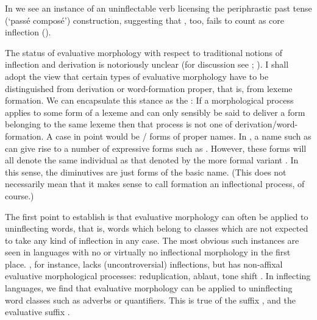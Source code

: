 \documentclass[output=paper,colorlinks,citecolor=brown]{langscibook}
\begin{document}
In  we see an instance of an uninflectable  verb licensing the periphrastic past tense (`passé composé') construction, suggesting that , too, fails to count as core inflection (\citealp[208]{spencerpopova2015}).

The status of evaluative morphology with respect to traditional notions of inflection and derivation is notoriously unclear (for discussion see \citealp[113]{spencer2013}; \citealp{grandi2015}). I shall adopt the view that certain types of evaluative morphology have to be distinguished from derivation or word-formation proper, that is, from lexeme formation. We can encapsulate this stance as the  \emph{}: If a morphological process applies to some form of a lexeme and can only sensibly be said to deliver a form belonging to the same lexeme then that process is not one of derivation/word-formation. A case in point would be / forms of proper names. In , a name such as  can give rise to a number of expressive  forms such as . However, these  forms will all denote the same individual as that denoted by the more formal variant .   In this sense, the diminutives are just forms of the basic name. (This does not necessarily mean that it makes sense to call  formation an inflectional process, of course.) 

The first point to establish is that evaluative morphology can often be applied to uninflecting words, that is, words which belong to classes which are not expected to take any kind of inflection in any case. The most obvious such instances are seen in languages with no or virtually no inflectional morphology in the first place.  , for instance, lacks (uncontroversial) inflections, but has non-affixal evaluative morphological processes: reduplication, ablaut, tone shift \citep{arcodia2015}. In  inflecting languages, we find that evaluative morphology can be applied to uninflecting word classes such as adverbs or quantifiers. This is true of the   suffix  \citep[197]{artiagoitia2015}, and the  evaluative suffix  \citep[416]{pensalfini2015}.  
\end{document}
